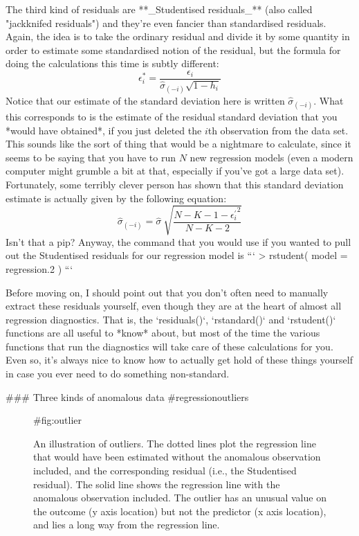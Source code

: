 The third kind of residuals are **_Studentised residuals_** (also called "jackknifed residuals") and they're even fancier than standardised residuals. Again, the idea is to take the ordinary residual and divide it by some quantity in order to estimate some standardised notion of the residual, but the formula for doing the calculations this time is subtly different:
$$
\epsilon_{i}^* = \frac{\epsilon_i}{\hat{\sigma}_{(-i)} \sqrt{1-h_i}}
$$
Notice that our estimate of the standard deviation here is written $\hat{\sigma}_{(-i)}$. What this corresponds to is the estimate of the residual standard deviation that you *would have obtained*, if you just deleted the $i$th observation from the data set. This sounds like the sort of thing that would be a nightmare to calculate, since it seems to be saying that you have to run $N$ new regression models (even a modern computer might grumble a bit at that, especially if you've got a large data set). Fortunately, some terribly clever person has shown that this standard deviation estimate is actually given by the following equation:
$$
\hat\sigma_{(-i)} = \hat{\sigma} \ \sqrt{\frac{N-K-1 - {\epsilon_{i}^\prime}^2}{N-K-2}}
$$
Isn't that a pip? Anyway, the command that you would use if you wanted to pull out the Studentised residuals for our regression model is
```
> rstudent( model = regression.2 )
```

Before moving on, I should point out that you don't often need to manually extract these residuals yourself, even though they are at the heart of almost all regression diagnostics. That is, the `residuals()`, `rstandard()` and `rstudent()` functions are all useful to *know* about, but most of the time the various functions that run the diagnostics will take care of these calculations for you. Even so, it's always nice to know how to actually get hold of these things yourself in case you ever need to do something non-standard.





### Three kinds of anomalous data {#regressionoutliers}


\begin{figure}[t]
\begin{center}
\caption{An illustration of outliers. The dotted lines plot the regression line that would have been estimated without the anomalous observation included, and the corresponding residual (i.e., the Studentised residual). The solid line shows the regression line with the anomalous observation included. The outlier has an unusual value on the outcome (y axis location) but not the predictor (x axis location), and lies a long way from the regression line.}
\HR
{#fig:outlier}
\end{center}
\end{figure}

